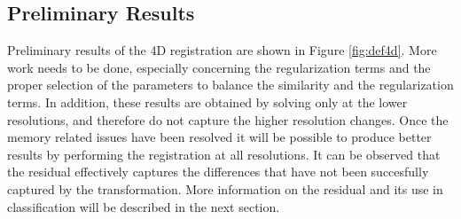 \subsection{Preliminary Results}

Preliminary results of the 4D registration are shown in Figure \ref{fig:def4d}. More work needs to be done, especially concerning the regularization terms and the proper selection of the parameters to balance the similarity and the regularization terms. In addition, these results are obtained by solving only at the lower resolutions, and therefore do not capture the higher resolution changes. Once the memory related issues have been resolved it will be possible to produce better results by performing the registration at all resolutions. It can be observed that the residual effectively captures the differences that have not been succesfully captured by the transformation. More information on the residual and its use in classification will be described in the next section.

